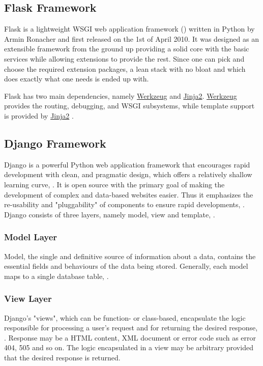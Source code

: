 \subsection{Flask Framework}
Flask is a lightweight \ac{WSGI} web application framework (\citet{Ronacher:2010}) written in Python by Armin Ronacher and first released on the 1st of April 2010.  It was designed as an extensible framework from the ground up providing a solid core with the basic services while allowing extensions to provide the rest. Since one can pick and choose the required
extension packages, a lean stack with no bloat and which
does exactly what one needs is ended up with.


Flask has two main dependencies, namely \href{http://werkzeug.pocoo.org/}{Werkzeug} and \href{http://jinja.pocoo.org/}{Jinja2}. \href{http://werkzeug.pocoo.org/}{Werkzeug} provides the routing, debugging, and \ac{WSGI} subsystems, while template support is provided by \href{http://jinja.pocoo.org/}{Jinja2} \citet{Grinberg:2014}.
\subsection{Django Framework}
Django is a powerful Python web application framework that encourages rapid development with clean, and pragmatic design, which offers a relatively shallow learning curve, \citet{Antonio:2018}. It is open source with the primary goal of making the development of complex and data-based websites easier. Thus it emphasizes the re-usability and "pluggability" of components to ensure rapid developments, \citet{Zhou:2010}. Django consists of three layers, namely model, view and template, \citet{Adrian:2019}.
\subsubsection{Model Layer}
Model, the single and definitive source of information about a data, contains the essential fields and behaviours of the data being stored. Generally, each model maps to a single database table, \citet{Adrian:2019}.
\subsubsection{View Layer}
Django's "views", which can be function- or class-based, encapsulate the logic responsible for processing a user’s request and for returning the desired response, \citet{Adrian:2019}. Response may be a \ac{HTML} content, \ac{XML} document or error code such as error 404, 505 and so on. The logic encapsulated in a view may be arbitrary provided that the desired response is returned.
